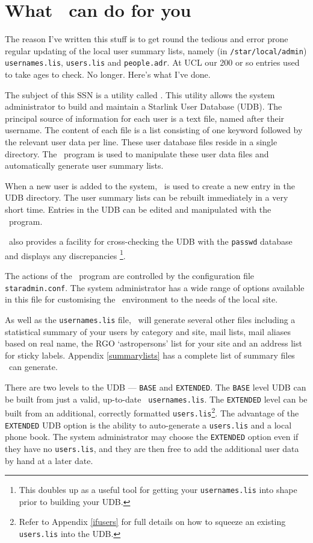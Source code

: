 \newpage

\section{What \staradmin\ can do for you}

The reason I've written this stuff is to get round the tedious and
error prone regular updating of the local user summary lists, namely
(in  {\tt /star/local/admin}) {\tt usernames.lis}, {\tt users.lis} and
{\tt people.adr}.  At UCL our 200 or so entries used to take ages to
check. No longer. Here's what I've done.

The subject of this SSN is a utility called \staradmin. This utility
allows the system administrator to build and maintain a Starlink User
Database (UDB). The principal source of information for each user is a
text file, named after their username. The content of each file is a
list consisting of one keyword followed by the relevant user data per
line. These user database files reside in a single directory. The
\staradmin\ program is used to manipulate these user data files and
automatically generate user summary lists.

When a new user is added to the system, \staradmin\ is used to create a
new entry in the UDB directory. The user summary lists can be rebuilt
immediately in a very short time. Entries in the UDB can be edited and
manipulated with the \staradmin\ program. 

\staradmin\ also provides a facility for cross-checking the UDB with the
{\tt passwd} database and displays any discrepancies \footnote{This
doubles up as a useful tool for getting your {\tt usernames.lis} into
shape prior to building your UDB.}. 

The actions of the \staradmin\ program are controlled by the configuration
file {\tt staradmin.conf}. The system administrator has a wide range of
options available in this file for customising the \staradmin\ environment
to the needs of the local site. 

As well as the {\tt usernames.lis} file, \staradmin\ will generate several
other files including a statistical summary of your users by category and
site, mail lists, mail aliases based on real name, the RGO `astropersons'
list for your site and an address list for sticky labels. Appendix
\ref{summarylists} has a complete list of summary files \staradmin\ can
generate. 

There are two levels to the UDB --- {\tt BASE} and {\tt EXTENDED}. The
{\tt BASE} level UDB can be built from just a valid, up-to-date {\tt
usernames.lis}.  The {\tt EXTENDED} level can be built from an additional,
correctly formatted {\tt users.lis}\footnote{Refer to Appendix
\ref{ifusers} for full details on how to squeeze an existing {\tt
users.lis} into the UDB.}. The advantage of the {\tt EXTENDED} UDB option
is the ability to auto-generate a {\tt users.lis} and a local phone book.
The system administrator may choose the {\tt EXTENDED} option even if they
have no {\tt users.lis}, and they are then free to add the additional user
data by hand at a later date. 

